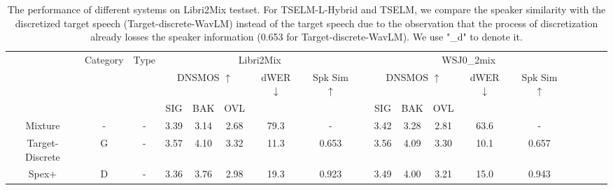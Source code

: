 \documentclass[conference]{IEEEtran}
\begin{document}
\begin{table}
  \caption{The performance of different systems on Libri2Mix testset. For TSELM-L-Hybrid  
  and TSELM, we compare the speaker similarity with the discretized target speech 
  (Target-discrete-WavLM) instead of the target speech due to the observation that 
  the process of discretization already losses the speaker information (0.653 for 
  Target-discrete-WavLM). We use "\_d" to denote it. }
  \renewcommand{\arraystretch}{1.2}
  \begin{center}
  \begin{tabular}{cccccccccccccccccc}
    \Xhline{2\arrayrulewidth} %
  \multirow{3}{*}{System} & \multicolumn{1}{l}{\multirow{3}{*}{Category}} & \multicolumn{1}{l}{\multirow{3}{*}{Type}} &  \multicolumn{5}{c}{Libri2Mix}                    &                               & \multicolumn{5}{c}{WSJ0\_2mix}                                                  \\
  \cline{4-8} \cline{10-14}
                          & \multicolumn{1}{l}{}                                                 & \multicolumn{1}{l}{}                            & \multicolumn{3}{c}{DNSMOS $\uparrow$} & dWER $\downarrow$ & Spk Sim $\uparrow$ &  & \multicolumn{3}{c}{DNSMOS $\uparrow$} & dWER $\downarrow$ & Spk Sim $\uparrow$  \\ \cline{4-6} \cline{10-12}
                          & \multicolumn{1}{l}{}                                                    & \multicolumn{1}{l}{}                            & SIG         & BAK        & OVL        &                   &        &             & SIG         & BAK        & OVL        &                   &                    \\ \hline
  Mixture                 & -                                             & -                                                                                           & 3.39        & 3.14       & 2.68       & 79.3            & -        &           & 3.42        & 3.28       & 2.81       & 63.6            & -                  \\
  Target-Discrete         & G                                             & -                                                                                          & 3.57        & 4.10       & 3.32       & 11.3            & 0.653     &          & 3.56        & 4.09       & 3.30       & 10.1            & 0.657               \\ \hline
  Spex+                   & D                                             & -                                                                                  & 3.36        & 3.76       & 2.98       & 19.3            & 0.923     &          & 3.49        & 4.00       & 3.21       & 15.0            & 0.943             \\

\end{tabular}
\end{center}
\end{table}
\end{document}
